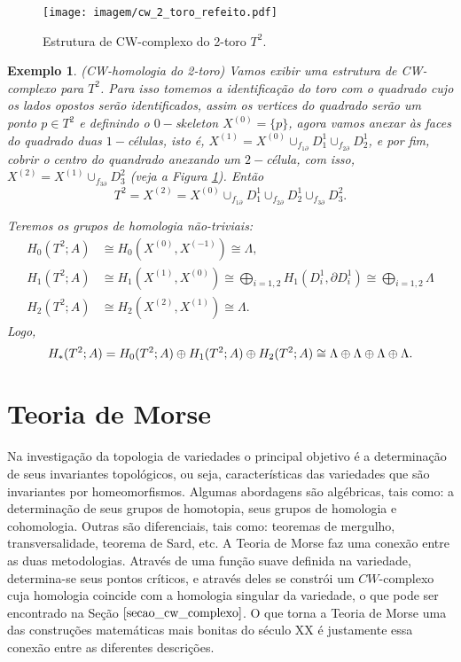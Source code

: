 \documentclass[12pt]{book}
\newtheorem{exemplo}[teorema]{Exemplo}
\newcommand{\celula}[2]{D^{#1}_{#2}}
\newcommand{\homologia}[2]{H_{#1}(#2;A)}
\newcommand{\homologiarelcel}[3]{H_{#1}(D^{#2}_{#3}, \partial D^{#2}_{#3})}
\newcommand{\homologiarelskele}[3]{H_{#1}(X^{(#2)}, X^{(#3)})}
\newcommand{\somadir}[1]{\bigoplus \limits_{#1}}
\newcommand{\skeleton}[1]{X^{(#1)}}
\begin{document}
	\begin{figure}[!h]
		\centering
		\texttt{[image: imagem/cw\_2\_toro\_refeito.pdf]}
		\caption{Estrutura de CW-complexo do 2-toro $T^{2}$.}
		\label{figura_cw_2_toro}
	\end{figure} 
	
	\begin{exemplo}
		(CW-homologia do 2-toro) Vamos exibir uma estrutura de CW-complexo para $T^{2}$. Para isso tomemos a identificação do toro com o quadrado cujo os lados opostos serão identificados, assim os vertices do quadrado serão um ponto $p \in T^{2}$ e definindo o $0-$skeleton $\skeleton{0} = \{p\}$, agora vamos anexar às faces do quadrado duas $1-$células, isto é, $\skeleton{1} = \skeleton{0}\cup_{f_{1\partial}}\celula{1}{1}\cup_{f_{2\partial}}\celula{1}{2}$, e por fim, cobrir o centro do quandrado anexando um $2-$célula, com isso, $\skeleton{2} = \skeleton{1}\cup_{f_{3\partial}}\celula{2}{3}$ (veja a Figura \ref{figura_cw_2_toro}). Então
		$$
		T^{2} =\skeleton{2} = \skeleton{0}\cup_{f_{1\partial}}\celula{1}{1}\cup_{f_{2\partial}}\celula{1}{2}\cup_{f_{3\partial}}\celula{2}{3}.
		$$
		
		Teremos os grupos de homologia não-triviais:
		$$
		\begin{aligned}
		\homologia{0}{T^{2}} &\cong \homologiarelskele{0}{0}{-1} \cong \Lambda,
		\\
		\homologia{1}{T^{2}} &\cong \homologiarelskele{1}{1}{0} \cong \somadir{i=1,2}\homologiarelcel{1}{1}{i} \cong \somadir{i=1,2}\Lambda
		\\
		\homologia{2}{T^{2}} &\cong \homologiarelskele{2}{2}{1} \cong \Lambda.
		\end{aligned}
		$$
		Logo,
		$$
		\\
		\homologia{*}{T^{2}} = \homologia{0}{T^{2}}\oplus\homologia{1}{T^{2}} \oplus\homologia{2}{T^{2}}\cong \Lambda\oplus\Lambda\oplus\Lambda\oplus\Lambda.
		$$
	\end{exemplo}	
	
	
	\chapter{Teoria de Morse}\label{capitulo_teoria_morse}
	Na investigação da topologia de variedades o principal objetivo é a determinação de seus invariantes topológicos, ou seja, características das variedades que são invariantes por homeomorfismos. Algumas abordagens são algébricas, tais como: a determinação de seus grupos de homotopia, seus grupos de homologia e cohomologia. Outras são diferenciais, tais como: teoremas de mergulho, transversalidade, teorema de Sard, etc. A Teoria de Morse faz uma conexão entre as duas metodologias. Através de uma função suave definida na variedade, determina-se seus pontos críticos, e através deles se constrói um $CW$-complexo cuja homologia coincide com a homologia singular da variedade, o que pode ser encontrado na Seção $\ref{secao_cw_complexo}$. O que torna a Teoria de Morse uma das construções matemáticas mais bonitas do século XX é justamente essa conexão entre as diferentes descrições.
	
\end{document}
